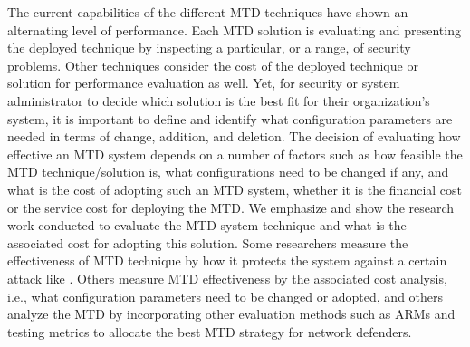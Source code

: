 The current capabilities of the different MTD techniques have shown an alternating level of performance. Each MTD solution is evaluating and presenting the deployed technique by inspecting a particular, or a range, of security problems. 
Other techniques consider the cost of the deployed technique or solution for performance evaluation as well. Yet, for security or system administrator to decide which solution is the best fit for their organization's system, it is important to define and identify what configuration parameters are needed in terms of change, addition, and deletion. The decision of evaluating how effective an MTD system depends on a number of factors such as how feasible the MTD technique/solution is, what configurations need to be changed if any, and what is the cost of adopting such an MTD system, whether it is the financial cost or the service cost for deploying the MTD. 
\newline We emphasize and show the research work conducted to evaluate the MTD system technique and what is the associated cost for adopting this solution. Some researchers measure the effectiveness of MTD technique by how it protects the system against a certain attack like . Others measure MTD effectiveness by the associated cost analysis, i.e., what configuration parameters need to be changed or adopted, and others analyze the MTD by incorporating other evaluation methods such as ARMs and testing metrics to allocate the best MTD strategy for network defenders. 
